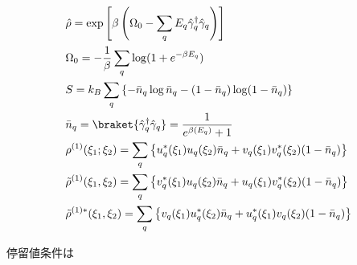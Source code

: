 \documentclass[dvipdfmx, 11pt, a4paper]{jsarticle}
\numberwithin{equation}{section}
\theoremstyle{definition}
\begin{document}
    \begin{note}[]
        \begin{align}
            &\hat{\rho} = \exp \left[ \beta\left( \Omega_0 - \sum_q E_q \hat{\gamma}^\dagger_q \hat{\gamma}_q \right) \right] \\
            &\Omega_0 = -\frac{1}{\beta}\sum_q\log (1+e^{-\beta E_q}) \\
            &S = k_B \sum_q\left\{ -\bar{n}_q\log \bar{n}_q - (1-\bar{n}_q)\log(1-\bar{n}_q) \right\} \\
            &\bar{n}_q = \braket{\hat{\gamma}_q^\dagger \hat{\gamma}_q} = \frac{1}{e^{\beta(E_q)}+1} \\
            &\rho^{(1)}(\xi_1;\xi_2)  
        = \sum_q\left\{ u_q^*(\xi_1)u_q(\xi_2)\bar{n}_q+v_q(\xi_1)v_q^*(\xi_2)(1-\bar{n}_q) \right\}   \\
        &\tilde{\rho}^{(1)}(\xi_1,\xi_2) 
        = \sum_q \left\{ v^*_q(\xi_1)u_q(\xi_2)\bar{n}_q + u_q(\xi_1) v^*_q(\xi_2) (1-\bar{n}_q)\right\} \\
        &\tilde{\rho}^{(1)*}(\xi_1,\xi_2) 
        = \sum_q \left\{ v_q(\xi_1)u_q^*(\xi_2)\bar{n}_q + u_q^*(\xi_1) v_q(\xi_2) (1-\bar{n}_q)\right\}
        \end{align}
    \end{note}
    停留値条件は
\end{document}
